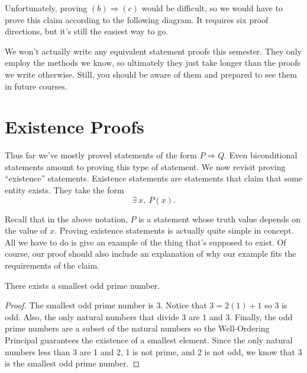 Unfortunately, proving $(b) \Rightarrow (c)$ would be difficult, so we would have to prove this claim according to the following diagram.  It requires six proof directions, but it's still the easiest way to go.

\begin{figure}[h]
\centering
{}
\end{figure}

We won't actually write any equivalent statement proofs this semester.  They only employ the methods we know, so ultimately they just take longer than the proofs we write otherwise.  Still, you should be aware of them and prepared to see them in future courses.


\section{Existence Proofs}
Thus far we've mostly proved statements of the form $P \Rightarrow Q$.  Even biconditional statements amount to proving this type of statement.  We now revisit proving ``existence'' statements.  Existence statements are statements that claim that some entity exists.  They take the form 
\[ \exists \ x, \ P(x).\]

\noindent Recall that in the above notation, $P$ is a statement whose truth value depends on the value of $x$.  Proving existence statements is actually quite simple in concept.  All we have to do is give an example of the thing that's supposed to exist.  Of course, our proof should also include an explanation of why our example fits the requirements of the claim.

\begin{claim} There exists a smallest odd prime number.
\end{claim}
\begin{proof}  The smallest odd prime number is 3.  Notice that $3=2(1)+1$ so 3 is odd.  Also, the only natural numbers that divide 3 are 1 and 3.  Finally, the odd prime numbers are a subset of the natural numbers so the Well-Ordering Principal guarantees the existence of a smallest element.  Since the only natural numbers less than 3 are 1 and 2, 1 is not prime, and 2 is not odd, we know that 3 is the smallest odd prime number.
\end{proof}

